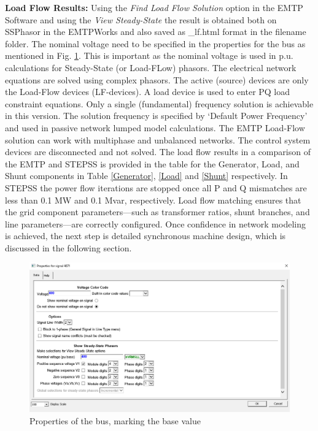 \documentclass{report}
\begin{document}
\textbf{Load Flow Results:} Using the \textit{Find Load Flow Solution} option in the EMTP Software and using the \textit{View Steady-State} the result is obtained both on SSPhasor in the EMTPWorks and also saved as \_lf.html format in the filename folder. The nominal voltage need to be specified in the properties for the bus as mentioned in Fig. \ref{fig:properties}. This is important as the nominal voltage is used in p.u. calculations for Steady-State (or Load-FLow) phasors. The electrical network equations are solved using complex phasors. The active (source) devices are only the Load-Flow devices (LF-devices). A load device is used to enter PQ load constraint equations. Only a single (fundamental) frequency solution is achievable in this version. The solution frequency is specified by ‘Default Power Frequency’ and used in passive network lumped model calculations. The EMTP Load-Flow solution can work with multiphase and unbalanced networks. The control system devices are disconnected and not solved. The load flow results in a comparison of the EMTP and STEPSS is provided in the table for the Generator, Load, and Shunt components in Table \ref{Generator}, \ref{Load} and \ref{Shunt} respectively.
In STEPSS the power flow iterations are stopped once all P and Q mismatches are less than 0.1 MW and 0.1 Mvar, respectively. 
Load flow matching ensures that the grid component parameters—such as transformer ratios, shunt branches, and line parameters—are correctly configured. Once confidence in network modeling is achieved, the next step is detailed synchronous machine design, which is discussed in the following section. 
\begin{figure}
    \centering
    \includegraphics[width=0.8\linewidth]{Figure_Nordic/Properties.png}
    \caption{Properties of the bus, marking the base value}
    \label{fig:properties}
\end{figure}
\end{document}
